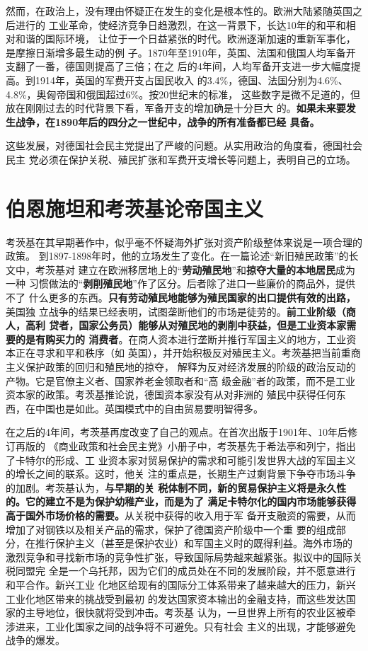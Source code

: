 然而，在政治上，没有理由怀疑正在发生的变化是根本性的。欧洲大陆紧随英国之后进行的
工业革命，使经济竞争日趋激烈，在这一背景下，长达10年的和平和相对和谐的国际环境，
让位于一个日益紧张的时代。欧洲逐渐加速的重新军事化，是摩擦日渐增多最生动的例
子。1870年至1910年，英国、法国和俄国人均军备开支翻了一番，德国则提高了三倍；在之
后的4年间，人均军备开支进一步大幅度提高。到1914年，英国的军费开支占国民收入
的3.4\%，德国、法国分别为4.6\%、4.8\%，奥匈帝国和俄国超过6\%。按20世纪末的标准，
这些数字是微不足道的，但放在刚刚过去的时代背景下看，军备开支的增加确是十分巨大
的。\textbf{如果未来要发生战争，在1890年后的四分之一世纪中，战争的所有准备都已经
  具备。}

这些发展，对德国社会民主党提出了严峻的问题。从实用政治的角度看，德国社会民主
党必须在保护关税、殖民扩张和军费开支增长等问题上，表明自己的立场。

\section{伯恩施坦和考茨基论帝国主义}
考茨基在其早期著作中，似乎毫不怀疑海外扩张对资产阶级整体来说是一项合理的政策。
到1897-1898年时，他的立场发生了变化。在一篇论述“新旧殖民政策”的长文中，考茨基对
建立在欧洲移居地上的“\textbf{劳动殖民地}”和\textbf{掠夺大量的本地居民}成为一种
习惯做法的“\textbf{剥削殖民地}”作了区分。后者除了进口一些廉价的商品外，提供不了
什么更多的东西。\textbf{只有劳动殖民地能够为殖民国家的出口提供有效的出路，}美国独
立战争的结果已经表明，试图垄断他们的市场是徒劳的。\textbf{前工业阶级（商人，高利
  贷者，国家公务员）能够从对殖民地的剥削中获益，但是工业资本家需要的是有购买力的
  消费者}。在商人资本进行垄断并推行军国主义的地方，工业资本正在寻求和平和秩序（如
英国），并开始积极反对殖民主义。考茨基把当前重商主义保护政策的回归和殖民地的掠夺，
解释为反对经济发展的阶级的政治反动的产物。它是官僚主义者、国家养老金领取者和“高
级金融”者的政策，而不是工业资本家的政策。考茨基推论说，德国资本家没有从对非洲的
殖民中获得任何东西，在中国也是如此。英国模式中的自由贸易要明智得多。

在之后的4年间，考茨基再度改变了自己的观点。在首次出版于1901年、10年后修订再版的
《商业政策和社会民主党》小册子中，考茨基先于希法亭和列宁，指出了卡特尔的形成、工
业资本家对贸易保护的需求和可能引发世界大战的军国主义的增长之间的联系。这时，他关
注的重点是，长期生产过剩背景下争夺市场斗争的加剧。考茨基认为，\textbf{与早期的关
  税体制不同，新的贸易保护主义将是永久性的。它的建立不是为保护幼稚产业，而是为了
  满足卡特尔化的国内市场能够获得高于国外市场价格的需要。}从关税中获得的收入用于军
备开支融资的需要，从而增加了对钢铁以及相关产品的需求，保护了德国资产阶级中一个重
要的组成部分，在推行保护主义（甚至是保护农业）和军国主义时的既得利益。海外市场的
激烈竞争和寻找新市场的竞争性扩张，导致国际局势越来越紧张。拟议中的国际关税同盟完
全是一个乌托邦，因为它们的成员处在不同的发展阶段，并不愿意进行和平合作。新兴工业
化地区给现有的国际分工体系带来了越来越大的压力，新兴工业化地区带来的挑战受到最初
的发达国家资本输出的金融支持，而这些发达国家的主导地位，很快就将受到冲击。考茨基
认为，一旦世界上所有的农业区被牵涉进来，工业化国家之间的战争将不可避免。只有社会
主义的出现，才能够避免战争的爆发。


